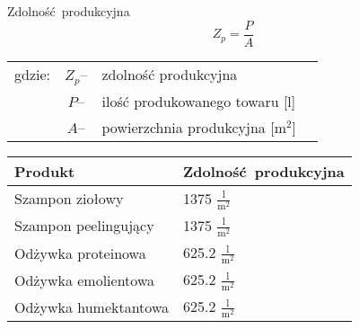 \newpage

Zdolność produkcyjna
\begin{equation}
	Z_{p} = \frac{P}{A}
\end{equation}
\begin{tabular}{rcll}
	gdzie:&$Z_{p}$--&zdolność produkcyjna \\
	&$P$--&ilość produkowanego towaru [l] \\
	&$A$--&powierzchnia produkcyjna [$\mathrm{m^{2}}$] \\
\end{tabular}

\begin{center}
	\begin{tabular}{ll}
		\hline
		Produkt & Zdolność produkcyjna\\
		\hline\hline
		Szampon ziołowy & 1375 $\mathrm{\frac{l}{m^{2}}}$\\
		Szampon peelingujący & 1375 $\mathrm{\frac{l}{m^{2}}}$ \\
		Odżywka proteinowa & 625.2 $\mathrm{\frac{l}{m^{2}}}$ \\
		Odżywka emolientowa & 625.2 $\mathrm{\frac{l}{m^{2}}}$ \\
		Odżywka humektantowa & 625.2 $\mathrm{\frac{l}{m^{2}}}$ \\
		\hline
	\end{tabular}
\end{center}

